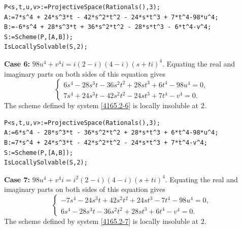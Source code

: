 \documentclass[a4paper,12pt,english,reqno]{amsart}
\begin{document}
\begin{lstlisting}
P<s,t,u,v>:=ProjectiveSpace(Rationals(),3);
A:=7*s^4 + 24*s^3*t - 42*s^2*t^2 - 24*s*t^3 + 7*t^4-98*u^4;
B:=-6*s^4 + 28*s^3*t + 36*s^2*t^2 - 28*s*t^3 - 6*t^4-v^4;
S:=Scheme(P,[A,B]);
IsLocallySolvable(S,2);
\end{lstlisting}


{\bf Case 6:}  $98u^4+v^4i=i(2-i)(4-i)(s+ti)^4$. Equating the real and imaginary parts on both sides of this equation gives
\begin{equation}\label{4165.2-6}
\begin{cases}
6s^4 - 28s^3t - 36s^2t^2 + 28st^3 + 6t^4 - 98u^4=0,\\
7s^4 + 24s^3t - 42s^2t^2 - 24st^3 + 7t^4 - v^4=0.
\end{cases}
\end{equation}
The scheme defined by system \eqref{4165.2-6} is locally insoluble at $2$.

\begin{lstlisting}
P<s,t,u,v>:=ProjectiveSpace(Rationals(),3);
A:=6*s^4 - 28*s^3*t - 36*s^2*t^2 + 28*s*t^3 + 6*t^4-98*u^4;
B:=7*s^4 + 24*s^3*t - 42*s^2*t^2 - 24*s*t^3 + 7*t^4-v^4;
S:=Scheme(P,[A,B]);
IsLocallySolvable(S,2);
\end{lstlisting}

{\bf Case 7:}  $98u^4+v^4i=i^2(2-i)(4-i)(s+ti)^4$. Equating the real and imaginary parts on both sides of this equation gives
\begin{equation}\label{4165.2-7}
\begin{cases}
-7s^4 - 24s^3t + 42s^2t^2 + 24st^3 - 7t^4 - 98u^4=0,\\
6s^4 - 28s^3t - 36s^2t^2 + 28st^3 + 6t^4 - v^4=0.
\end{cases}
\end{equation}
The scheme defined by system \eqref{4165.2-7} is locally insoluble at $2$.
\end{document}
